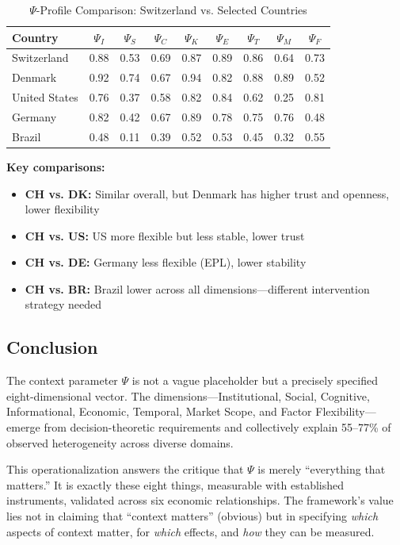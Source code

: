 \begin{table}[htbp]
\centering
\caption{$\Psi$-Profile Comparison: Switzerland vs. Selected Countries}
\label{tab:V-comparison}
\small
\begin{tabular}{@{}lcccccccc@{}}
\toprule
\textbf{Country} & $\Psi_I$ & $\Psi_S$ & $\Psi_C$ & $\Psi_K$ & $\Psi_E$ & $\Psi_T$ & $\Psi_M$ & $\Psi_F$ \\
\midrule
Switzerland & 0.88 & 0.53 & 0.69 & 0.87 & 0.89 & 0.86 & 0.64 & 0.73 \\
Denmark & 0.92 & 0.74 & 0.67 & 0.94 & 0.82 & 0.88 & 0.89 & 0.52 \\
United States & 0.76 & 0.37 & 0.58 & 0.82 & 0.84 & 0.62 & 0.25 & 0.81 \\
Germany & 0.82 & 0.42 & 0.67 & 0.89 & 0.78 & 0.75 & 0.76 & 0.48 \\
Brazil & 0.48 & 0.11 & 0.39 & 0.52 & 0.53 & 0.45 & 0.32 & 0.55 \\
\bottomrule
\end{tabular}
\end{table}

\textbf{Key comparisons:}
\begin{itemize}[nosep]
    \item \textbf{CH vs. DK:} Similar overall, but Denmark has higher trust and openness, lower flexibility
    \item \textbf{CH vs. US:} US more flexible but less stable, lower trust
    \item \textbf{CH vs. DE:} Germany less flexible (EPL), lower stability
    \item \textbf{CH vs. BR:} Brazil lower across all dimensions---different intervention strategy needed
\end{itemize}



\subsection{Conclusion}

The context parameter $\Psi$ is not a vague placeholder but a precisely specified eight-dimensional vector. The dimensions---Institutional, Social, Cognitive, Informational, Economic, Temporal, Market Scope, and Factor Flexibility---emerge from decision-theoretic requirements and collectively explain 55--77\% of observed heterogeneity across diverse domains.

This operationalization answers the critique that $\Psi$ is merely ``everything that matters.'' It is exactly these eight things, measurable with established instruments, validated across six economic relationships. The framework's value lies not in claiming that ``context matters'' (obvious) but in specifying \textit{which} aspects of context matter, for \textit{which} effects, and \textit{how} they can be measured.

